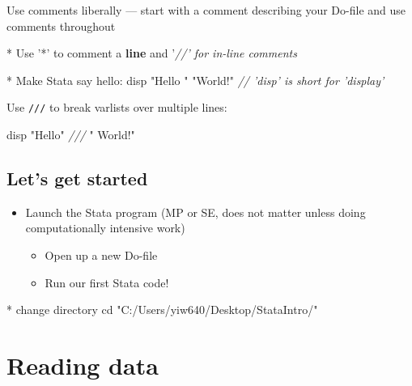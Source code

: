 \documentclass[
]{book}
\newenvironment{Shaded}{\begin{snugshade}}{\end{snugshade}}
\newcommand{\CommentTok}[1]{\textcolor[rgb]{0.56,0.35,0.01}{\textit{#1}}}
\newcommand{\KeywordTok}[1]{\textcolor[rgb]{0.13,0.29,0.53}{\textbf{#1}}}
\newcommand{\NormalTok}[1]{#1}
\newcommand{\StringTok}[1]{\textcolor[rgb]{0.31,0.60,0.02}{#1}}
\providecommand{\tightlist}{%
  \setlength{\itemsep}{0pt}\setlength{\parskip}{0pt}}
\begin{document}
Use comments liberally --- start with a comment describing your Do-file and use comments throughout

\begin{Shaded}
\begin{Highlighting}[]
\NormalTok{* Use '*' to comment a }\KeywordTok{line}\NormalTok{ and '}\CommentTok{//' for in-line comments}

\NormalTok{* Make Stata say hello:}
\NormalTok{disp }\StringTok{"Hello "} \StringTok{"World!"} \CommentTok{// 'disp' is short for 'display'}
\end{Highlighting}
\end{Shaded}

Use \texttt{///} to break varlists over multiple lines:

\begin{Shaded}
\begin{Highlighting}[]
\NormalTok{disp }\StringTok{"Hello"} \CommentTok{///}
     \StringTok{" World!"}
\end{Highlighting}
\end{Shaded}

\hypertarget{lets-get-started}{%
\subsection{Let's get started}\label{lets-get-started}}

\begin{itemize}
\tightlist
\item
  Launch the Stata program (MP or SE, does not matter unless doing computationally intensive work)

  \begin{itemize}
  \tightlist
  \item
    Open up a new Do-file
  \item
    Run our first Stata code!
  \end{itemize}
\end{itemize}

\begin{Shaded}
\begin{Highlighting}[]
\NormalTok{* change directory}
\NormalTok{cd }\StringTok{"C:/Users/yiw640/Desktop/StataIntro/"}
\end{Highlighting}
\end{Shaded}

\hypertarget{reading-data-2}{%
\section{Reading data}\label{reading-data-2}}
\end{document}
